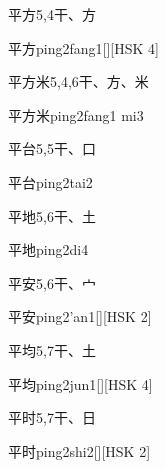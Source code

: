 \begin{entry}{平方}{5,4}{⼲、⽅}
  \begin{phonetics}{平方}{ping2fang1}[][HSK 4]
  \end{phonetics}
\end{entry}

\begin{entry}{平方米}{5,4,6}{⼲、⽅、⽶}
  \begin{phonetics}{平方米}{ping2fang1 mi3}
  \end{phonetics}
\end{entry}

\begin{entry}{平台}{5,5}{⼲、⼝}
  \begin{phonetics}{平台}{ping2tai2}
  \end{phonetics}
\end{entry}

\begin{entry}{平地}{5,6}{⼲、⼟}
  \begin{phonetics}{平地}{ping2di4}
  \end{phonetics}
\end{entry}

\begin{entry}{平安}{5,6}{⼲、⼧}
  \begin{phonetics}{平安}{ping2'an1}[][HSK 2]
  \end{phonetics}
\end{entry}

\begin{entry}{平均}{5,7}{⼲、⼟}
  \begin{phonetics}{平均}{ping2jun1}[][HSK 4]
  \end{phonetics}
\end{entry}

\begin{entry}{平时}{5,7}{⼲、⽇}
  \begin{phonetics}{平时}{ping2shi2}[][HSK 2]
  \end{phonetics}
\end{entry}

